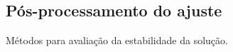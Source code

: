 \subsection{Pós-processamento do ajuste}
Métodos para avaliação da estabilidade da solução.

 
% 
%

